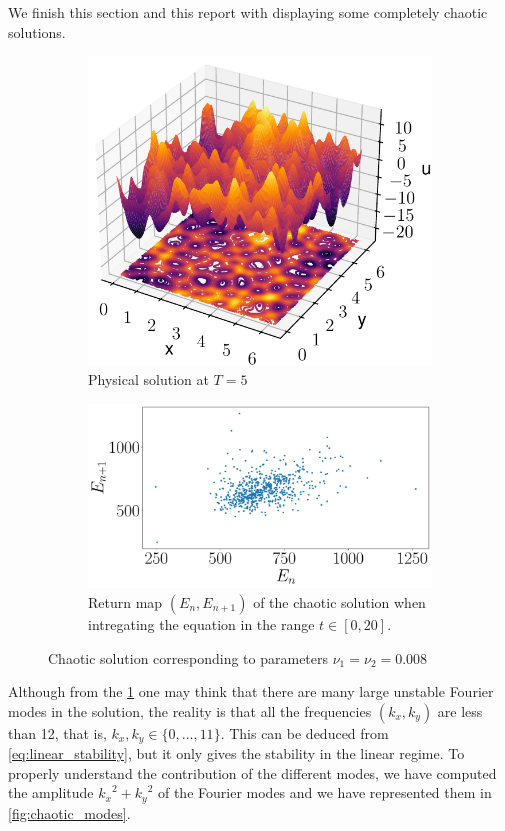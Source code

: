\documentclass[twoside]{article}
\begin{document}
We finish this section and this report with displaying some completely chaotic solutions.
\begin{figure}[ht]
  \centering
  \begin{subfigure}[ht]{0.45\textwidth}
    \includegraphics[width=\textwidth]{images/slice_nu1_0.008_nu2_0.008_time_5.0.pdf}
    \caption{Physical solution at $T=5$}
    \label{fig:chaotic_phys}
  \end{subfigure}\hfill
  \begin{subfigure}[ht]{0.45\textwidth}
    \includegraphics[width=\textwidth]{images/c_return.pdf}
    \caption{Return map $(E_n,E_{n+1})$ of the chaotic solution when intregating the equation in the range $t\in[0,20]$.}
  \end{subfigure}
  \caption{Chaotic solution corresponding to parameters $\nu_1=\nu_2=0.008$}
  \label{fig:chaotic}
\end{figure}
Although from the \cref{fig:chaotic_phys} one may think that there are many large unstable Fourier modes in the solution, the reality is that all the frequencies $(k_x,k_y)$ are less than 12, that is, $k_x,k_y\in\{0,\dots,11\}$. This can be deduced from \cref{eq:linear_stability}, but it only gives the stability in the linear regime. To properly understand the contribution of the different modes, we have computed the amplitude ${k_x}^2+{k_y}^2$ of the Fourier modes and we have represented them in \cref{fig:chaotic_modes}.
\end{document}
